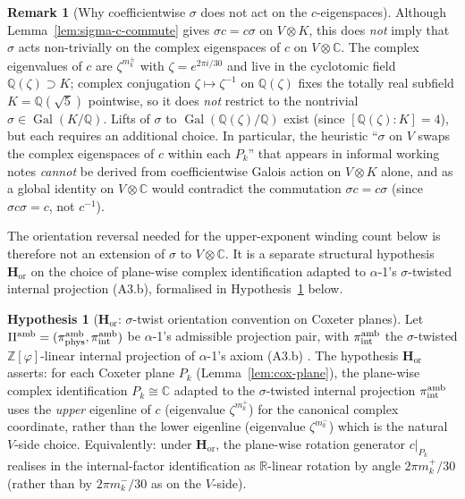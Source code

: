 \documentclass[11pt, a4paper]{amsart}
\theoremstyle{definition}
\newtheorem{remark}[theorem]{Remark}
\newtheorem{hypothesis}[theorem]{Hypothesis}
\newcommand{\R}{\mathbb{R}}
\newcommand{\C}{\mathbb{C}}
\newcommand{\Q}{\mathbb{Q}}
\newcommand{\Gal}{\operatorname{Gal}}
\newcommand{\Hor}{\mathbf{H}_{\mathrm{or}}}
\newcommand{\Ophi}{\mathbb{Z}[\varphi]}
\begin{document}
\begin{remark}[Why coefficientwise $\sigma$ does not act on
  the $c$-eigenspaces]
\label{rmk:sigma-no-action}
Although Lemma~\ref{lem:sigma-c-commute} gives $\sigma c =
c \sigma$ on $V \otimes K$, this does \emph{not} imply that
$\sigma$ acts non-trivially on the complex eigenspaces of
$c$ on $V \otimes \C$. The complex eigenvalues of $c$ are
$\zeta^{m_k^\pm}$ with $\zeta = e^{2\pi i / 30}$ and live
in the cyclotomic field $\Q(\zeta) \supset K$; complex
conjugation $\zeta \mapsto \zeta^{-1}$ on $\Q(\zeta)$ fixes
the totally real subfield $K = \Q(\sqrt 5)$ pointwise, so
it does \emph{not} restrict to the nontrivial $\sigma \in
\Gal(K/\Q)$. Lifts of $\sigma$ to $\Gal(\Q(\zeta)/\Q)$
exist (since $[\Q(\zeta) : K] = 4$), but each requires an
additional choice. In particular, the heuristic
``$\sigma$ on $V$ swaps the complex eigenspaces of $c$
within each $P_k$'' that appears in informal working notes
\emph{cannot} be derived from coefficientwise Galois
action on $V \otimes K$ alone, and as a global identity on
$V \otimes \C$ would contradict the commutation $\sigma c
= c \sigma$ (since $\sigma c \sigma = c$, not $c^{-1}$).

The orientation reversal needed for the upper-exponent
winding count below is therefore not an extension of
$\sigma$ to $V \otimes \C$. It is a separate structural
hypothesis $\Hor$ on the choice of plane-wise complex
identification adapted to $\alpha$-1's $\sigma$-twisted
internal projection (A3.b), formalised in
Hypothesis~\ref{hyp:Horient} below.
\end{remark}

\begin{hypothesis}[$\Hor$: $\sigma$-twist orientation
  convention on Coxeter planes]
\label{hyp:Horient}
Let $\Pi^{\rm amb} = (\pi_{\rm phys}^{\rm amb}, \pi_{\rm
int}^{\rm amb})$ be $\alpha$-1's admissible projection pair,
with $\pi_{\rm int}^{\rm amb}$ the $\sigma$-twisted
$\Ophi$-linear internal projection of $\alpha$-1's axiom
(A3.b) \cite[(A3.b)]{Cascade12D}. The hypothesis $\Hor$
asserts: for each Coxeter plane $P_k$
(Lemma~\ref{lem:cox-plane}), the plane-wise complex
identification $P_k \cong \C$ adapted to the
$\sigma$-twisted internal projection $\pi_{\rm int}^{\rm
amb}$ uses the \emph{upper} eigenline of $c$ (eigenvalue
$\zeta^{m_k^+}$) for the canonical complex coordinate,
rather than the lower eigenline (eigenvalue $\zeta^{m_k^-}$)
which is the natural $V$-side choice. Equivalently: under
$\Hor$, the plane-wise rotation generator $c|_{P_k}$
realises in the internal-factor identification as
$\R$-linear rotation by angle $2\pi m_k^+ / 30$ (rather than
by $2\pi m_k^- / 30$ as on the $V$-side).
\end{hypothesis}
\end{document}
